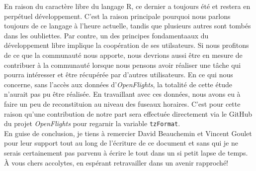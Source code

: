 En raison du caractère libre du langage R, ce dernier a toujours été et restera en perpétuel développement. C'est la raison principale pourquoi nous parlons toujours de ce langage à l'heure actuelle, tandis que plusieurs autres sont tombés dans les oubliettes. Par contre, un des principes fondamentaaux du développement libre implique la coopération de ses utilsateurs. Si nous profitons de ce que la communauté nous apporte, nous devrions aussi être en mesure de contribuer à la communauté lorsque nous pensons avoir réaliser une tâche qui pourra intéresser et être récupérée par d'autres utilisateurs. En ce qui nous concerne, sans l'accès aux données d'\emph{OpenFlights}, la totalité de cette étude n'aurait pas pu être réalisée. En travaillant avec ces données, nous avons eu à faire un peu de reconstituion au niveau des fuseaux horaires. C'est pour cette raison qu'une contribution de notre part sera effectuée directement via le GitHub du projet \emph{OpenFlights} pour regarnir la variable \texttt{tzFormat}. \\

En guise de conclusion, je tiens à remercier David Beauchemin et Vincent Goulet pour leur support tout au long de l'écriture de ce document et sans qui je ne serais certainement pas parvenu à écrire le tout dans un si petit lapse de temps. À vous chers accolytes, en espérant retravailler dans un avenir rapproché!
